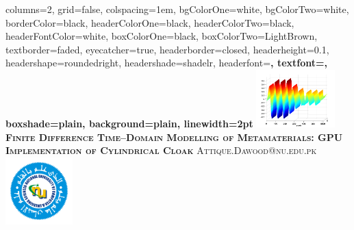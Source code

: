 \documentclass[portrait,final,a1paper,fontscale=0.4]{baposter}
\begin{document}


\begin{poster}%
  {
  columns=2,
  grid=false,
  colspacing=1em,
  bgColorOne=white,
  bgColorTwo=white,
  borderColor=black,
  headerColorOne=black,
  headerColorTwo=black,
  headerFontColor=white,
  boxColorOne=black,
  boxColorTwo=LightBrown,
  textborder=faded,
  eyecatcher=true,
  headerborder=closed,
  headerheight=0.1\textheight,
  headershape=roundedright,
  headershade=shadelr,
  headerfont=\Large\bf\textsc, %
  textfont={\setlength{\parindent}{1.5em}},
  boxshade=plain,
  background=plain,
  linewidth=2pt
  }
  { 
  \includegraphics[height=6.0em]{Figures/FigCh03_2DDNGSteadyStateLossy}
  } 
  {\bf\textsc{Finite Difference Time--Domain Modelling of Metamaterials: GPU Implementation of Cylindrical Cloak}\vspace{0.2em}}
  {\textsc{Attique.Dawood@nu.edu.pk}\vspace{-0.4em}}
  {%
    \includegraphics[height=7.0em]{Figures/NU_Logo}
  }


\end{poster}
\end{document}
